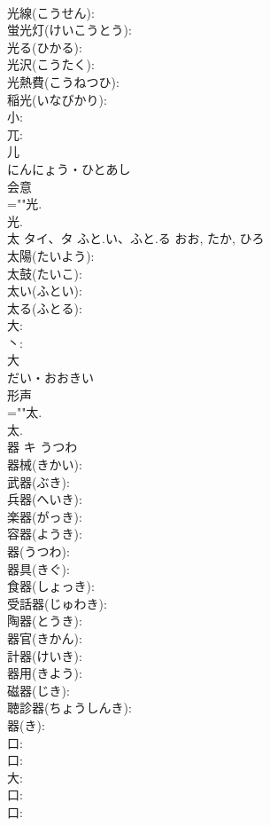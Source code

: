 \documentclass[8pt]{extreport}
\begin{document}
\begin{CJK}{UTF8}{min}
\\	光線(こうせん): 
\\	蛍光灯(けいこうとう): 
\\	光る(ひかる): 
\\	光沢(こうたく): 
\\	光熱費(こうねつひ): 
\\	稲光(いなびかり): 
\\	小: 
\\	兀: 
\\	儿	
\\	にんにょう・ひとあし	
\\	会意 
\\	=""光.
\\	光.
\\	太	タイ、タ	ふと.い、ふと.る	おお, たか, ひろ	
\\	太陽(たいよう): 
\\	太鼓(たいこ): 
\\	太い(ふとい): 
\\	太る(ふとる): 
\\	大: 
\\	丶: 
\\	大	
\\	だい・おおきい	
\\	形声 
\\	=""太.
\\	太.
\\	器	キ	うつわ		
\\	器械(きかい): 
\\	武器(ぶき): 
\\	兵器(へいき): 
\\	楽器(がっき): 
\\	容器(ようき): 
\\	器(うつわ): 
\\	器具(きぐ): 
\\	食器(しょっき): 
\\	受話器(じゅわき): 
\\	陶器(とうき): 
\\	器官(きかん): 
\\	計器(けいき): 
\\	器用(きよう): 
\\	磁器(じき): 
\\	聴診器(ちょうしんき): 
\\	器(き): 
\\	口: 
\\	口: 
\\	大: 
\\	口: 
\\	口: 

\end{CJK}
\end{document}
